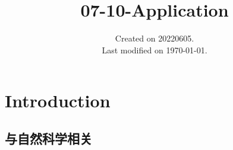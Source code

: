 \documentclass[UTF8]{../computerUniverse}
\begin{document}
\title{07-10-Application}
\date{Created on 20220605.\\   Last modified on \today.}
\maketitle
\tableofcontents

\chapter{Introduction}

\section{与自然科学相关}
\end{document}
